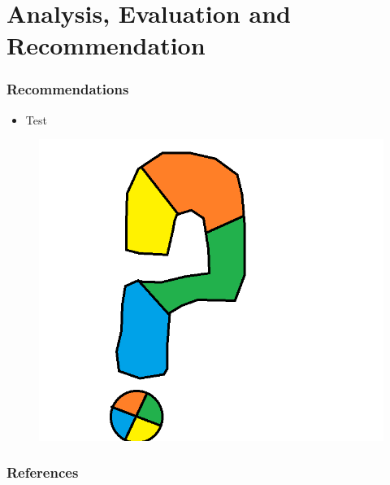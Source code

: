 \documentclass[12pt,norsk]{beamer}
\begin{document}
\section{Analysis, Evaluation and Recommendation}
\begin{frame}

	\frametitle{Recommendations}
		
	\begin{itemize}
		\item Test
	\end{itemize}
	
	\begin{figure}[h]
    	\centering
    	\includegraphics[scale=0.45]{images/questionmark.png}
    
	\end{figure}

\end{frame}


\begin{frame}

	\frametitle{References}
		
	
		

\end{frame}




\end{document}
